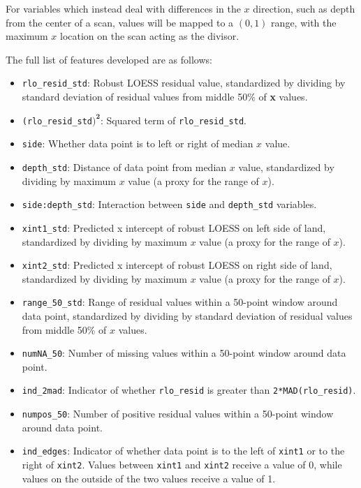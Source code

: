 \documentclass[12pt]{article}
\begin{document}
For variables which instead deal with differences in the \(x\)
direction, such as depth from the center of a scan, values will be
mapped to a \((0, 1)\) range, with the maximum \(x\) location on the
scan acting as the divisor.

The full list of features developed are as follows:

\begin{itemize}

\item[] \texttt{rlo\_resid\_std}: Robust LOESS residual value, standardized by dividing by standard deviation of residual values from middle 50\% of \textbf{x} values.  

\item[] \texttt{(rlo\_resid\_std$\mathbf{)^2}$}: Squared term of \texttt{rlo\_resid\_std}.  

\item[] \texttt{side}: Whether data point is to left or right of median $x$ value.  

\item[] \texttt{depth\_std}: Distance of data point from median $x$ value, standardized by dividing by maximum $x$ value (a proxy for the range of $x$).  

\item[] \texttt{side:depth\_std}: Interaction between \texttt{side} and \texttt{depth\_std} variables.  

\item[] \texttt{xint1\_std}: Predicted x intercept of robust LOESS on left side of land, standardized by dividing by maximum $x$ value (a proxy for the range of $x$).  

\item[] \texttt{xint2\_std}: Predicted x intercept of robust LOESS on right side of land, standardized by dividing by maximum $x$ value (a proxy for the range of $x$).  

\item[] \texttt{range\_50\_std}: Range of residual values within a 50-point window around data point, standardized by dividing by standard deviation of residual values from middle 50\% of $x$ values.  

\item[] \texttt{numNA\_50}: Number of missing values within a 50-point window around data point.  

\item[] \texttt{ind\_2mad}: Indicator of whether \texttt{rlo\_resid} is greater than \texttt{2*MAD(rlo\_resid)}.  

\item[] \texttt{numpos\_50}: Number of positive residual values within a 50-point window around data point.  

\item[] \texttt{ind\_edges}: Indicator of whether data point is to the left of \texttt{xint1} or to the right of \texttt{xint2}. Values between \texttt{xint1} and \texttt{xint2} receive a value of 0, while values on the outside of the two values receive a value of 1.  

\end{itemize}
\end{document}

